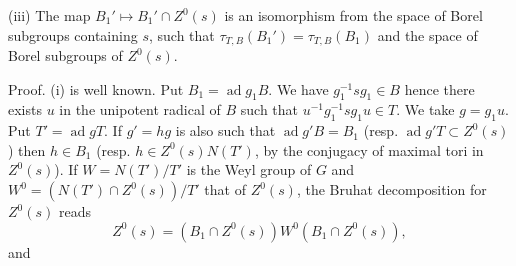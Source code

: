 \documentclass[9pt,twoside]{extarticle}
\begin{document}
{(iii) The map \(B_1'\mapsto B_1'\cap Z^0(s)\) is an isomorphism from the space of Borel subgroups containing \(s\), such that \(\tau_{T,B}(B_1')=\tau_{T,B}(B_1)\) and the space of Borel subgroups of \(Z^0(s)\).\par

Proof. (i) is well known. Put \(B_1=\operatorname{ad}g_1B\). We have \(g_1^{-1}sg_1\in B\) hence there exists \(u\) in the unipotent radical of \(B\) such that \(u^{-1}g_1^{-1}sg_1u\in T\). We take \(g=g_1u\). Put \(T'=\operatorname{ad}gT\). If \(g'=hg\) is also such that \(\operatorname{ad}g'B=B_1\) (resp. \(\operatorname{ad}g'T\subset Z^0(s)\)) then \(h\in B_1\) (resp. \(h\in Z^0(s)N(T')\), by the conjugacy of maximal tori in \(Z^0(s)\)). If \(W=N(T')/T'\) is the Weyl group of \(G\) and \(W^0=(N(T')\cap Z^0(s))/T'\) that of \(Z^0(s)\), the Bruhat decomposition for \(Z^0(s)\) reads \[
Z^0(s)=(B_1\cap Z^0(s))W^0(B_1\cap Z^0(s)),
\] and\par
}
\end{document}
